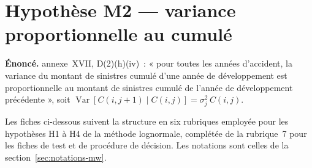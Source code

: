 \documentclass[a4paper,11pt]{article}
\begin{document}
\clearpage
\section{Hypothèse M2 --- variance proportionnelle au cumulé}
\label{sec:mwm2}

\begin{encadre}
\textbf{Énoncé.} annexe~XVII, D(2)(h)(iv)~: « pour toutes les années
d'accident, la variance du montant de sinistres cumulé d'une année de
développement est proportionnelle au montant de sinistres cumulé de l'année de
développement précédente », soit
$\operatorname{Var}[C(i,j+1)\mid C(i,j)] = \sigma_j^2\,C(i,j)$.
\end{encadre}

Les fiches ci-dessous suivent la structure en six rubriques employée pour les
hypothèses H1 à H4 de la méthode lognormale, complétée de la rubrique~7 pour les
fiches de test et de procédure de décision. Les notations sont celles de la
section~\ref{sec:notations-mw}.
\end{document}
